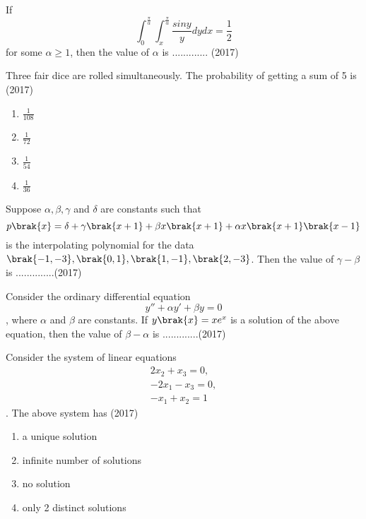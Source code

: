 
\iffalse
\chapter{2017}
\author{AI24BTECH11008}
\section{xe}
\fi

    \item[1.] If $$\int_{0}^{\frac{\pi}{\alpha}}\int_{x}^{\frac{\pi}{\alpha}}\frac{siny}{y}dydx = \frac{1}{2}$$ for some $\alpha \geq 1$, then the value of $\alpha$ is ............. \hfill (2017)
    \item[2.] Three fair dice are rolled simultaneously. The probability of getting a sum of 5 is \hfill (2017)
    \begin{enumerate}[label = (\Alph*)]
        \item $\frac{1}{108}$
        \item $\frac{1}{72}$
        \item $\frac{1}{54}$
        \item $\frac{1}{36}$
    \end{enumerate} 
    \item[3.] Suppose $\alpha, \beta, \gamma$ and $\delta$ are constants such that $$p\brak{x} = \delta + \gamma\brak{x+1}+\beta x\brak{x+1} + \alpha x\brak{x+1}\brak{x-1}$$ is the interpolating polynomial for the data $\brak{-1,-3},\brak{0,1},\brak{1,-1},\brak{2,-3}$. Then the value of $\gamma - \beta$ is ..............\hfill (2017)
    \item[4.] Consider the ordinary differential equation $$y'' + \alpha y' + \beta y =0$$, where $\alpha$ and $\beta$ are constants. If $y\brak{x} = xe^x$ is a solution of the above equation, then the value of $\beta-\alpha$ is .............\hfill (2017)
    \item[5.] Consider the system of linear equations \begin{align*}2x_2 + x_3 =0,\\-2x_1 - x_3=0,\\-x_1 + x_2=1\end{align*}. The above system has \hfill (2017)
    \begin{enumerate}[label = (\Alph*)]
        \item a unique solution 
        \item infinite number of solutions
        \item no solution
        \item only 2 distinct solutions
    \end{enumerate}
